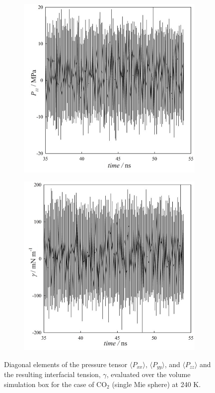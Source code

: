 \documentclass[9pt,bestpractices]{livecoms}
\begin{document}
\begin{figure}
\begin{subfigure}{0.45\linewidth}
	\end{subfigure}
	\begin{subfigure}{0.45\linewidth} %
    \includegraphics[width=1\textwidth]{gfx/fig_15_c.jpeg}
	\end{subfigure}
	\begin{subfigure}{0.45\linewidth} %
    \includegraphics[width=1\textwidth]{gfx/fig_15_d.jpeg}
	\end{subfigure}
\caption{Diagonal elements of the pressure tensor ${\langle}P_{xx}{\rangle}$, ${\langle}P_{yy}{\rangle}$, and ${\langle}P_{zz}{\rangle}$ and the resulting interfacial tension, ${\gamma}$, evaluated over the volume simulation box for the case of CO$_{2}$ (single Mie sphere) at 240 K.
}
\label{fig:16}
\end{figure}
\end{document}
